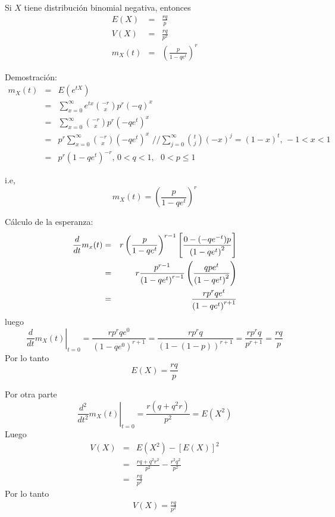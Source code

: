 \begin{i}
\begin{theorem}
Si $X$ tiene distribución binomial negativa, entonces
\begin{eqnarray*}
E(X) &=&\frac{rq}{p} \\
V(X) &=&\frac{rq}{p^{2}} \\
m_{X}(t) &=&\left( \frac{p}{1-qe^{t}}\right) ^{r}
\end{eqnarray*}
\end{theorem}

Demostración: 
\begin{eqnarray*}
m_{X}(t) &=&E(e^{tX}) \\
&=&\sum_{x=0}^{\infty }e^{tx}\binom{-r}{x}p^{r}(-q)^{x} \\
&=&\sum_{x=0}^{\infty }\binom{-r}{x}p^{r}(-qe^{t})^{x} \\
&=&p^{r}\sum_{x=0}^{\infty }\binom{-r}{x}(-qe^{t})^{x}\text{ //}
\sum_{j=0}^{\infty }\binom{t}{j}(-x)^{j}=(1-x)^{t}\text{, }-1<x<1 \\
&=&p^{r}\left( 1-qe^{t}\right) ^{-r}\text{, \ \ }0<q<1,\text{ }0<p\leq 1
\end{eqnarray*}

i.e,
\begin{equation*}
m_{X}(t)=\left( \frac{p}{1-qe^{t}}\right) ^{r}
\end{equation*}

Cálculo de la esperanza:
\begin{eqnarray*}
\frac{d}{dt}m_{x}(t) &=&r\left( \frac{p}{1-qe^{t}}\right) ^{r-1}\left[ \frac{%
0-(-qe^{-t})p}{\left( 1-qe^{t}\right) ^{2}}\right] \\
&=&r\frac{p^{r-1}}{\left( 1-qe^{t}\right) ^{r-1}}\left( \frac{qpe^{t}}{%
\left( 1-qe^{t}\right) ^{2}}\right) \\
&=&\frac{rp^{r}qe^{t}}{\left( 1-qe^{t}\right) ^{r+1}}
\end{eqnarray*}
luego
\begin{equation*}
\left. \frac{d}{dt}m_{X}(t)\right\vert _{t=0}=\frac{rp^{r}qe^{0}}{\left(
1-qe^{0}\right) ^{r+1}}=\frac{rp^{r}q}{\left( 1-(1-p)\right) ^{r+1}}=\frac{
rp^{r}q}{p^{r+1}}=\frac{rq}{p}
\end{equation*}
Por lo tanto
\begin{equation*}
E(X)=\frac{rq}{p}
\end{equation*}

Por otra parte
\begin{equation*}
\left. \frac{d^{2}}{dt^{2}}m_{X}(t)\right\vert _{t=0}=\frac{r(q+q^{2}r)}{
p^{2}}=E(X^{2})
\end{equation*}
Luego 
\begin{eqnarray*}
V(X) &=&E(X^{2})-\left[ E(X)\right] ^{2} \\
&=&\frac{rq+q^{2}r^{2}}{p^{2}}-\frac{r^{2}q^{2}}{p^{2}} \\
&=&\frac{rq}{p^{2}}
\end{eqnarray*}
Por lo tanto
\begin{eqnarray*}
V(X)=\frac{rq}{p^{2}}
\end{eqnarray*}




\end{i}
